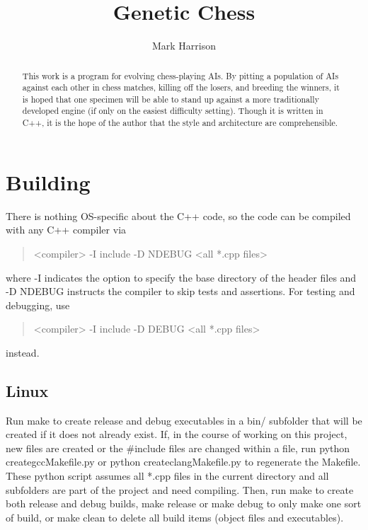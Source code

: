 \documentclass[letterpaper]{article}
\title{Genetic Chess}
\author{Mark Harrison}
\newcommand{\cpp}{C{\nobreak +}{\nobreak +}}
\newcommand{\code}[1]{\textsf{#1}}
\renewcommand{\_}{\allowbreak\textunderscore\allowbreak}
\begin{document}
\maketitle

\begin{abstract}
This work is a program for evolving chess-playing AIs.  By pitting a population of AIs against each other in chess matches, killing off the losers, and breeding the winners, it is hoped that one specimen will be able to stand up against a more traditionally developed engine (if only on the easiest difficulty setting). Though it is written in \cpp{}, it is the hope of the author that the style and architecture are comprehensible.
\end{abstract}

\tableofcontents{}


\section{Building}
There is nothing OS-specific about the \cpp{} code, so the code can be compiled with any \cpp{} compiler via
\begin{quote}
	\code{<compiler> -I include -D NDEBUG <all *.cpp files>}
\end{quote}
where \code{-I} indicates the option to specify the base directory of the header files and \code{-D NDEBUG} instructs the compiler to skip tests and assertions. For testing and debugging, use
\begin{quote}
	\code{<compiler> -I include -D DEBUG <all *.cpp files>}
\end{quote}
instead.

\subsection{Linux}
Run \code{make} to create release and debug executables in a \code{bin/} subfolder that will be created if it does not already exist. If, in the course of working on this project, new files are created or the \code{\#include} files are changed within a file, run \code{python create\_gcc\_Makefile.py} or \code{python create\_clang\_Makefile.py} to regenerate the Makefile. These python script assumes all \code{*.cpp} files in the current directory and all subfolders are part of the project and need compiling. Then, run \code{make} to create both release and debug builds, \code{make release} or \code{make debug} to only make one sort of build, or \code{make clean} to delete all build items (object files and executables).
\end{document}
